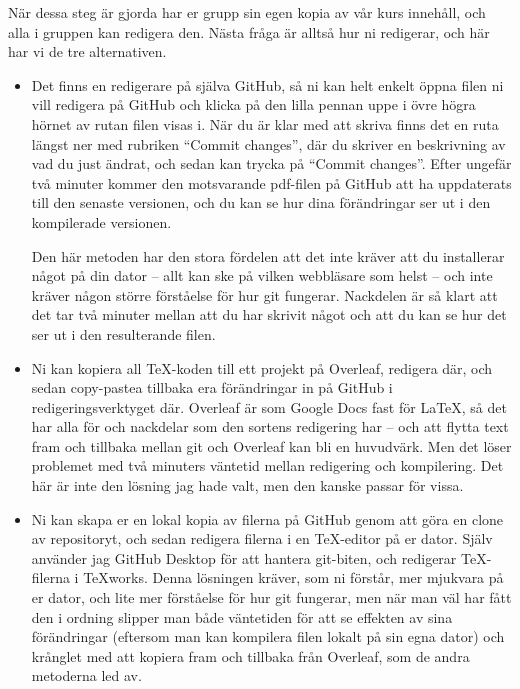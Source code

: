 \documentclass{tufte-handout}
\begin{document}
När dessa steg är gjorda har er grupp sin egen kopia av vår kurs innehåll, och alla i gruppen kan redigera den. Nästa fråga är alltså hur ni redigerar, och här har vi de tre alternativen.
\begin{itemize}
	\item Det finns en redigerare på själva GitHub, så ni kan helt enkelt öppna filen ni vill redigera på GitHub och klicka på den lilla pennan uppe i övre högra hörnet av rutan filen visas i. När du är klar med att skriva finns det en ruta längst ner med rubriken ``Commit changes'', där du skriver en beskrivning av vad du just ändrat, och sedan kan trycka på ``Commit changes''. Efter ungefär två minuter kommer den motsvarande pdf-filen på GitHub att ha uppdaterats till den senaste versionen, och du kan se hur dina förändringar ser ut i den kompilerade versionen.

	Den här metoden har den stora fördelen att det inte kräver att du installerar något på din dator -- allt kan ske på vilken webbläsare som helst -- och inte kräver någon större förståelse för hur git fungerar. Nackdelen är så klart att det tar två minuter mellan att du har skrivit något och att du kan se hur det ser ut i den resulterande filen.
	\item Ni kan kopiera all TeX-koden till ett projekt på Overleaf, redigera där, och sedan copy-pastea tillbaka era förändringar in på GitHub i redigeringsverktyget där. Overleaf är som Google Docs fast för \LaTeX, så det har alla för och nackdelar som den sortens redigering har -- och att flytta text fram och tillbaka mellan git och Overleaf kan bli en huvudvärk. Men det löser problemet med två minuters väntetid mellan redigering och kompilering. Det här är inte den lösning jag hade valt, men den kanske passar för vissa.
	\item Ni kan skapa er en lokal kopia av filerna på GitHub genom att göra en clone av repositoryt, och sedan redigera filerna i en TeX-editor på er dator. Själv använder jag GitHub Desktop för att hantera git-biten, och redigerar TeX-filerna i TeXworks. Denna lösningen kräver, som ni förstår, mer mjukvara på er dator, och lite mer förståelse för hur git fungerar, men när man väl har fått den i ordning slipper man både väntetiden för att se effekten av sina förändringar (eftersom man kan kompilera filen lokalt på sin egna dator) och krånglet med att kopiera fram och tillbaka från Overleaf, som de andra metoderna led av.
\end{itemize}
\end{document}
